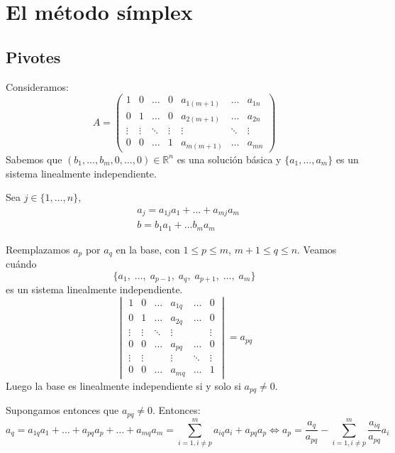 \chapter{El método símplex}
\section{Pivotes}
Consideramos:
$$A = \begin{pmatrix}
        1      & 0      & \dots  & 0      & a_{1(m+1)} & \dots  & a_{1n} \\
        0      & 1      & \dots  & 0      & a_{2(m+1)} & \dots  & a_{2n} \\
        \vdots & \vdots & \ddots & \vdots & \vdots     & \ddots & \vdots \\
        0      & 0      & \dots  & 1      & a_{m(m+1)} & \dots  & a_{mn}
    \end{pmatrix}$$
Sabemos que $(b_1, \dots, b_m, 0, \dots, 0) \in \mathbb{R}^n$ es una solución básica y $\{a_1, \dots, a_m\}$ es un sistema linealmente independiente.

Sea $j \in \{1, \dots, n\}$,
\begin{align*}
     & a_j = a_{1j}a_1 + \dots + a_{mj}a_m \\
     & b = b_1a_1 + \dots b_ma_m
\end{align*}

Reemplazamos $a_p$ por $a_q$ en la base, con $1 \leq p \leq m$, $m+1 \leq q \leq n$.
Veamos cuándo
$$\{a_1, \; \dots, \; a_{p-1}, \; a_q, \; a_{p+1}, \; \dots, \; a_m\}$$
es un sistema linealmente independiente.
$$\begin{vmatrix}
        1      & 0      & \dots  & a_{1q} & \dots  & 0      \\
        0      & 1      & \dots  & a_{2q} & \dots  & 0      \\
        \vdots & \vdots & \ddots & \vdots &        & \vdots \\
        0      & 0      & \dots  & a_{pq} & \dots  & 0      \\
        \vdots & \vdots &        & \vdots & \ddots & \vdots \\
        0      & 0      & \dots  & a_{mq} & \dots  & 1
    \end{vmatrix} = a_{pq}$$
Luego la base es linealmente independiente si y solo si $a_{pq} \neq 0$.

Supongamos entonces que $a_{pq} \neq 0$.
Entonces:
$$a_q = a_{1q}a_1 + \dots + a_{pq}a_p + \dots + a_{mq}a_m = \sum_{i=1, i \neq p}^m a_{iq}a_i + a_{pq}a_p \Leftrightarrow a_p = \frac{a_q}{a_{pq}} - \sum_{i=1, i \neq p}^m \frac{a_{iq}}{a_{pq}}a_i$$


